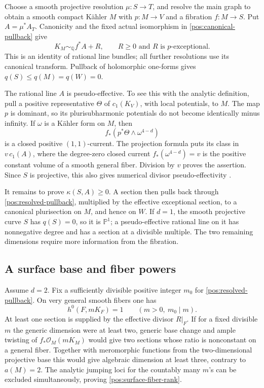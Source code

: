 \documentclass[11pt,letterpaper]{article}
\newcommand{\Q}{\mathbb{Q}}
\newcommand{\PP}{\mathbb{P}}
\newcommand{\OO}{\mathcal{O}}
\theoremstyle{definition}
\theoremstyle{remark}
\begin{document}
Choose a smooth projective resolution \(\mu:S\to T\), and resolve
the main graph to obtain a smooth compact Kähler \(M\) with
\(p:M\to V\) and a fibration \(f:M\to S\). Put \(A=\mu^*A_T\).
Canonicity and the fixed actual isomorphism in
\eqref{pos:canonical-pullback} give
\begin{equation}\label{pos:resolved-pullback}
 K_M\sim_{\Q}f^*A+R,
 \qquad R\geq0\text{ and }R\text{ is }p\text{-exceptional}.
\end{equation}
This is an identity of rational line bundles; all further resolutions
use its canonical transform. Pullback of holomorphic one-forms gives
\(q(S)\leq q(M)=q(W)=0\).

The rational line \(A\) is pseudo-effective. To see this with the
analytic definition, pull a positive representative \(\Theta\) of
\(c_1(K_V)\), with local potentials, to \(M\). The map \(p\) is
dominant, so its plurisubharmonic potentials do not become identically
minus infinity. If \(\omega\) is a Kähler form on \(M\), then
\[
 f_*(p^*\Theta\wedge\omega^{4-d})
\]
is a closed positive \((1,1)\)-current. The projection formula puts its
class in \(v\,c_1(A)\), where the degree-zero closed current
\(f_*(\omega^{4-d})=v\) is the positive constant volume of a smooth
general fiber. Division by \(v\) proves the assertion. Since \(S\)
is projective, this also gives numerical divisor pseudo-effectivity
\cite{BDPP}.

It remains to prove \(\kappa(S,A)\geq0\). A section then pulls back
through \eqref{pos:resolved-pullback}, multiplied by the effective
exceptional section, to a canonical plurisection on \(M\), and hence
on \(W\). If \(d=1\), the smooth projective curve \(S\) has
\(q(S)=0\), so it is \(\PP^1\); a pseudo-effective rational line on
it has nonnegative degree and has a section at a divisible multiple.
The two remaining dimensions require more information from the
fibration.

\subsection{A surface base and fiber powers}

Assume \(d=2\). Fix a sufficiently divisible positive integer \(m_0\)
for \eqref{pos:resolved-pullback}. On very general smooth fibers one
has
\begin{equation}\label{pos:surface-fiber-rank}
 h^0(F,mK_F)=1\qquad(m>0,\ m_0\mid m).
\end{equation}
At least one section is supplied by the effective divisor \(R|_F\).
If for a fixed divisible \(m\) the generic dimension were at least
two, generic base change and ample twisting of
\(f_*\OO_M(mK_M)\) would give two sections whose ratio is nonconstant
on a general fiber. Together with meromorphic functions from the
two-dimensional projective base this would give algebraic dimension
at least three, contrary to \(a(M)=2\). The analytic jumping loci
for the countably many \(m\)'s can be excluded simultaneously, proving
\eqref{pos:surface-fiber-rank}.
\end{document}
